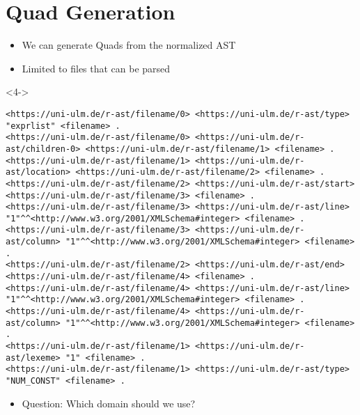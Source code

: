 \documentclass[aspectratio=169,usepdftitle=true,handout,10pt]{beamer}
\begin{document}
\section[Quad Generation]{Quad Generation}
\begin{frame}[fragile]{\insertsection}
\begin{itemize}
   \item<2-> We can generate Quads from the normalized AST
   \item<3-> Limited to files that can be parsed
\end{itemize}
\bigskip
\begin{uncoverenv}<4->
\soldisablenumhl
\begin{verbatim}
<https://uni-ulm.de/r-ast/filename/0> <https://uni-ulm.de/r-ast/type> "exprlist" <filename> .
<https://uni-ulm.de/r-ast/filename/0> <https://uni-ulm.de/r-ast/children-0> <https://uni-ulm.de/r-ast/filename/1> <filename> .
<https://uni-ulm.de/r-ast/filename/1> <https://uni-ulm.de/r-ast/location> <https://uni-ulm.de/r-ast/filename/2> <filename> .
<https://uni-ulm.de/r-ast/filename/2> <https://uni-ulm.de/r-ast/start> <https://uni-ulm.de/r-ast/filename/3> <filename> .
<https://uni-ulm.de/r-ast/filename/3> <https://uni-ulm.de/r-ast/line> "1"^^<http://www.w3.org/2001/XMLSchema#integer> <filename> .
<https://uni-ulm.de/r-ast/filename/3> <https://uni-ulm.de/r-ast/column> "1"^^<http://www.w3.org/2001/XMLSchema#integer> <filename> .
<https://uni-ulm.de/r-ast/filename/2> <https://uni-ulm.de/r-ast/end> <https://uni-ulm.de/r-ast/filename/4> <filename> .
<https://uni-ulm.de/r-ast/filename/4> <https://uni-ulm.de/r-ast/line> "1"^^<http://www.w3.org/2001/XMLSchema#integer> <filename> .
<https://uni-ulm.de/r-ast/filename/4> <https://uni-ulm.de/r-ast/column> "1"^^<http://www.w3.org/2001/XMLSchema#integer> <filename> .
<https://uni-ulm.de/r-ast/filename/1> <https://uni-ulm.de/r-ast/lexeme> "1" <filename> .
<https://uni-ulm.de/r-ast/filename/1> <https://uni-ulm.de/r-ast/type> "NUM_CONST" <filename> .
\end{verbatim}
\end{uncoverenv}\bigskip
\begin{itemize}
   \item<5-> Question: Which domain should we use?
\end{itemize}
\end{frame}
\end{document}
